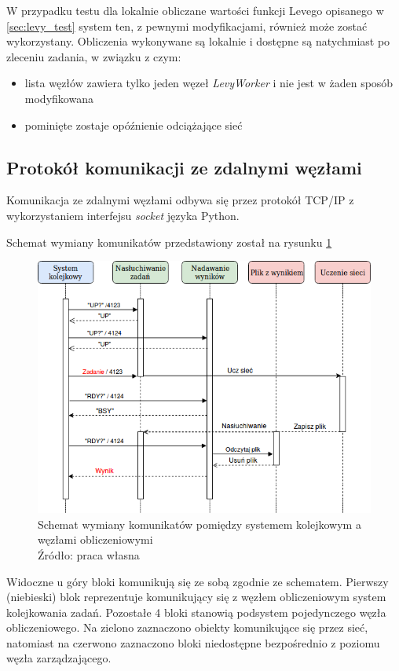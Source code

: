 W przypadku testu dla lokalnie obliczane wartości funkcji Levego opisanego w \ref{sec:levy_test} system ten, z pewnymi modyfikacjami, również może zostać wykorzystany.
Obliczenia wykonywane są lokalnie i dostępne są natychmiast po zleceniu zadania, w związku z czym:
\begin{itemize}
  \item lista węzłów zawiera tylko jeden węzeł \textit{LevyWorker} i nie jest w żaden sposób modyfikowana
  \item pominięte zostaje opóźnienie odciążające sieć
\end{itemize}

\subsection{Protokół komunikacji ze zdalnymi węzłami}\label{sec:communication}

Komunikacja ze zdalnymi węzłami odbywa się przez protokół TCP/IP z wykorzystaniem interfejsu \textit{socket} języka Python.

Schemat wymiany komunikatów przedstawiony został na rysunku \ref{fig:komunikacja}
\begin{figure}[h!tb]
	 \centering
	 \includegraphics[width = 1.0\linewidth]{img/komunikacja}
	 \caption{Schemat wymiany komunikatów pomiędzy systemem kolejkowym a węzłami obliczeniowymi \\
              Źródło: praca własna}
	 \label{fig:komunikacja}
\end{figure}

Widoczne u góry bloki komunikują się ze sobą zgodnie ze schematem.
Pierwszy (niebieski) blok reprezentuje komunikujący się z węzłem obliczeniowym system kolejkowania zadań.
Pozostałe 4 bloki stanowią podsystem pojedynczego węzła obliczeniowego.
Na zielono zaznaczono obiekty komunikujące się przez sieć, natomiast na czerwono zaznaczono bloki niedostępne bezpośrednio z poziomu węzła zarządzającego.

